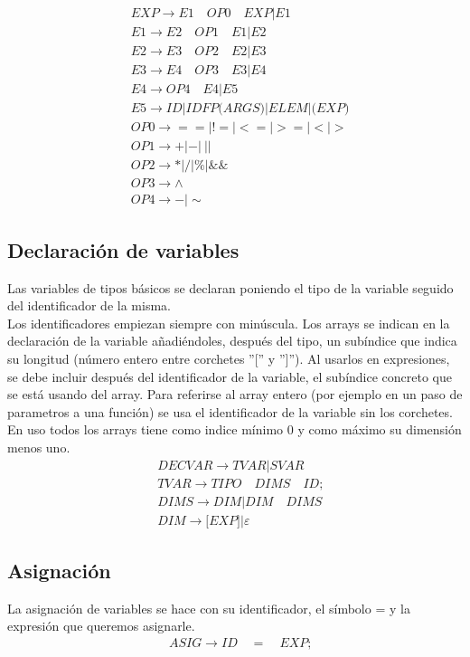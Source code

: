 \documentclass[a4paper, 12pt]{article}
\begin{document}
\begin{align*}
&EXP \rightarrow E1\quad OP0\quad  EXP | E1\\
&E1 \rightarrow E2\quad  OP1\quad  E1 | E2\\
&E2 \rightarrow E3\quad  OP2\quad  E2 | E3\\
&E3 \rightarrow E4\quad  OP3\quad  E3 | E4\\
&E4 \rightarrow OP4\quad  E4 | E5\\
&E5 \rightarrow ID|IDFP \textrm{(}ARGS\textrm{)}|ELEM|\textbf{(}EXP\textbf{)}\\
&OP0 \rightarrow ==|!=|<=|>=|<|>\\
&OP1 \rightarrow +|-|\ ||\\
&OP2 \rightarrow *|/|\%| \&\&\\
&OP3 \rightarrow \wedge\\
&OP4 \rightarrow -|\sim
\end{align*}

\subsection{Declaración de variables}
Las variables de tipos básicos se declaran poniendo el tipo de la variable seguido del identificador de la misma.\\

Los identificadores empiezan siempre con minúscula. Los arrays se indican en la declaración de la variable añadiéndoles, después del tipo, un subíndice que indica su longitud (número entero entre corchetes ''['' y '']''). Al usarlos en expresiones, se debe incluir después del identificador de la variable, el subíndice concreto que se está usando del array. Para referirse al array entero (por ejemplo en un paso de parametros a una función) se usa el identificador de la variable sin los corchetes. En uso todos los arrays tiene como indice mínimo 0 y como máximo su dimensión menos uno.
\begin{align*}
&DECVAR \rightarrow  TVAR | SVAR\\
&TVAR \rightarrow  TIPO \quad DIMS \quad ID \textrm{;}\\
&DIMS \rightarrow DIM | DIM \quad DIMS\\
&DIM \rightarrow \textrm{[} EXP \textrm{]}|\varepsilon
\end{align*}

\subsection{Asignación}
La asignación de variables se hace con su identificador, el símbolo = y la expresión que queremos asignarle.
\begin{align*}
&ASIG \rightarrow ID \quad  =\quad EXP \textrm{;}
\end{align*}
\end{document}
